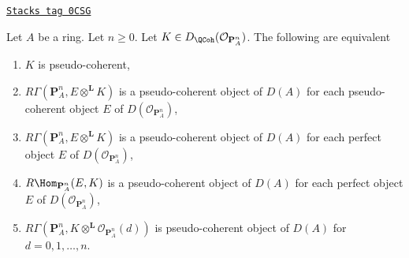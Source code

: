 \begin{lemma}
\label{perfect-lemma-pseudo-coherent-on-projective-space}
\href{https://stacks.math.columbia.edu/tag/0CSG}{\texttt{Stacks tag 0CSG}}

Let $A$ be a ring. Let $n \geq 0$. Let
$K \in D_\QCoh(\mathcal{O}_{\mathbf{P}^n_A})$.
The following are equivalent
\begin{enumerate}
\item $K$ is pseudo-coherent,
\item $R\Gamma(\mathbf{P}^n_A, E \otimes^\mathbf{L} K)$ is a pseudo-coherent
object of $D(A)$ for each pseudo-coherent object $E$ of
$D(\mathcal{O}_{\mathbf{P}^n_A})$,
\item $R\Gamma(\mathbf{P}^n_A, E \otimes^\mathbf{L} K)$ is a pseudo-coherent
object of $D(A)$ for each perfect object $E$ of
$D(\mathcal{O}_{\mathbf{P}^n_A})$,
\item $R\Hom_{\mathbf{P}^n_A}(E, K)$ is a pseudo-coherent
object of $D(A)$ for each perfect object $E$ of
$D(\mathcal{O}_{\mathbf{P}^n_A})$,
\item $R\Gamma(\mathbf{P}^n_A,
K \otimes^\mathbf{L} \mathcal{O}_{\mathbf{P}^n_A}(d))$ is pseudo-coherent
object of $D(A)$ for $d = 0, 1, \ldots, n$.
\end{enumerate}
\end{lemma}

